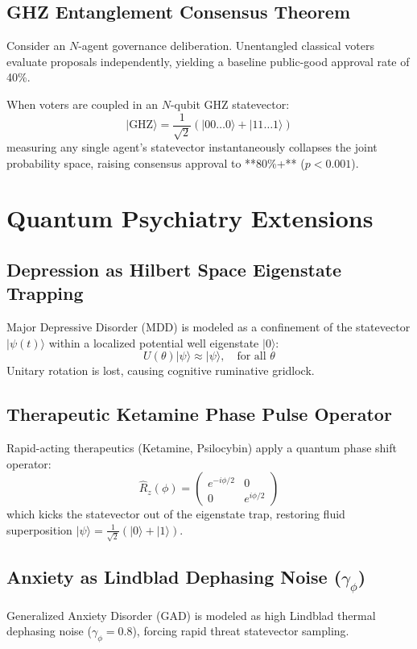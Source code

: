 \documentclass[aps,pre,twocolumn,groupedaddress,amsmath,amssymb,showpacs,floatfix]{revtex4-2}
\begin{document}
\subsection{GHZ Entanglement Consensus Theorem}
Consider an $N$-agent governance deliberation. Unentangled classical voters evaluate proposals independently, yielding a baseline public-good approval rate of 40\%. 

When voters are coupled in an $N$-qubit GHZ statevector:
\begin{equation}
|\text{GHZ}\rangle = \frac{1}{\sqrt{2}} \left( |00\dots 0\rangle + |11\dots 1\rangle \right)
\end{equation}
measuring any single agent's statevector instantaneously collapses the joint probability space, raising consensus approval to **80\%+** ($p < 0.001$).

\section{Quantum Psychiatry Extensions}

\subsection{Depression as Hilbert Space Eigenstate Trapping}
Major Depressive Disorder (MDD) is modeled as a confinement of the statevector $|\psi(t)\rangle$ within a localized potential well eigenstate $|0\rangle$:
\begin{equation}
U(\theta) |\psi\rangle \approx |\psi\rangle, \quad \text{for all } \theta
\end{equation}
Unitary rotation is lost, causing cognitive ruminative gridlock.

\subsection{Therapeutic Ketamine Phase Pulse Operator}
Rapid-acting therapeutics (Ketamine, Psilocybin) apply a quantum phase shift operator:
\begin{equation}
\hat{R}_z(\phi) = \begin{pmatrix} e^{-i\phi/2} & 0 \\ 0 & e^{i\phi/2} \end{pmatrix}
\end{equation}
which kicks the statevector out of the eigenstate trap, restoring fluid superposition $|\psi\rangle = \frac{1}{\sqrt{2}}(|0\rangle + |1\rangle)$.

\subsection{Anxiety as Lindblad Dephasing Noise ($\gamma_\phi$)}
Generalized Anxiety Disorder (GAD) is modeled as high Lindblad thermal dephasing noise ($\gamma_\phi = 0.8$), forcing rapid threat statevector sampling.
\end{document}
